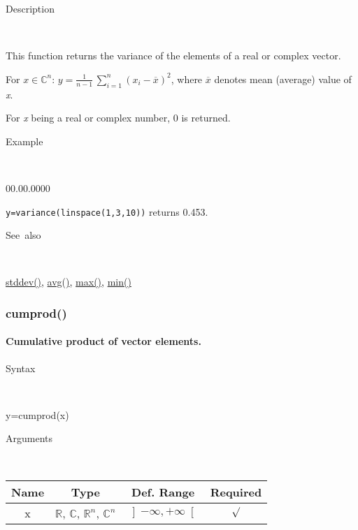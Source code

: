 \begin{description}
\item [Description]~
\end{description}
This function returns the variance of the elements of a real or complex
vector.

\medskip{}
For $x\in$$\mathbb{C}^{n}$: $y={\displaystyle \frac{1}{n-1}}\,$$\sum\limits _{i=1}^{n}\left(x_{i}-\overline{x}\right)^{2}$,
where $\overline{x}$ denotes mean (average) value of \textit{x}.
\medskip{}

\noindent For \textit{x} being a real or complex number, 0 is returned.

\begin{description}
\item [Example]~
\end{description}
\begin{lyxlist}{00.00.0000}
\item [\texttt{y=variance(linspace(1,3,10))}]returns 0.453.
\end{lyxlist}
\begin{description}
\item [See~also]~
\end{description}
\textcolor{blue}{\hyperlink{stddev}{stddev()}}\textcolor{black}{,}
\textcolor{blue}{\hyperlink{avg}{avg()}}\textcolor{black}{,} \textcolor{blue}{\hyperlink{max}{max()}}\textcolor{black}{,}
\textcolor{blue}{\hyperlink{min}{min()}}


\newpage
{}


\subsubsection*{\hypertarget{cumprod}{}{\Large cumprod()}}


\paragraph{\label{par:Cumulative-product}Cumulative product of vector elements.}

\begin{description}
\item [Syntax]~
\end{description}
y=cumprod(x)

\begin{description}
\item [Arguments]~
\end{description}
\begin{tabular}{|c|c|c|c|}
\hline 
Name&
Type&
Def. Range&
Required\tabularnewline
\hline
\hline 
x&
$\mathbb{R}$, $\mathbb{C}$, $\mathbb{R}^{n}$, $\mathbb{C}^{n}$&
$\left]-\infty,+\infty\right[$&
$\surd$\tabularnewline
\hline
\end{tabular}


